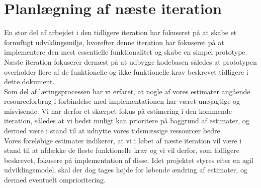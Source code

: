 \documentclass[12pt, a4paper]{article}
\begin{document}





\section{Planlægning af næste iteration}
En stor del af arbejdet i den tidligere iteration har fokuseret på at skabe et fornuftigt udviklingsmiljø, hvorefter denne iteration har fokuseret på at implementere den mest essentielle funktionalitet og skabe en simpel prototype. Næste iteration fokuserer dernæst på at udbygge kodebasen således at prototypen overholder flere af de funktionelle og ikke-funktionelle krav beskrevet tidligere i dette dokument.\\

Som del af læringsprocessen har vi erfaret, at nogle af vores estimater angående resourceforbrug i forbindelse med implementationen har været unøjagtige og misvisende. Vi har derfor et skærpet fokus på estimering i den kommende iteration, således at vi bedst muligt kan prioritere på baggrund af estimater, og dermed være i stand til at udnytte vores tidsmæssige ressourcer bedre.\\


Vores foreløbige estimater indikerer, at vi i løbet af næste iteration vil være i stand til at afdække de fleste funktionelle krav og vi vil derfor, som tidligere beskrevet, fokusere på implementation af disse. Idet projektet styres efter en agil udviklingsmodel, skal der dog tages højde for løbende ændring af estimater, og dermed eventuelt omprioritering.
\end{document}
